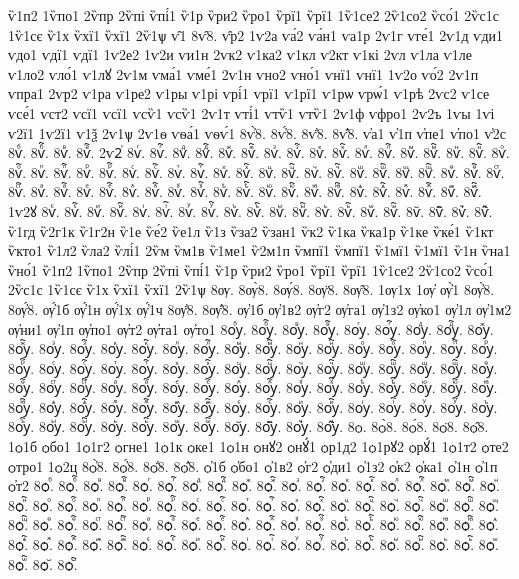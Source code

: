{ѷ1п2
1ѷпо1
2ѷпр
2ѷпі
ѷпі́1
ѷ1р
ѷри2
ѷро1
ѷрї1
ѷрї1
1ѷ1се2
2ѷ1со2
ѷсо́1
2ѷс1с
1ѷ1сє
ѷ1х
ѷхї1
ѷхї1
2ѷ1ѱ
ѵ̑1
8ѵ̑8.
ѵ̑р2
1ѵ2а
ѵа́2
ѵа́н1
ѵа1р
2ѵ1г
ѵге́1
2ѵ1д
ѵди1
ѵдо1
ѵдї1
ѵдї1
1ѵ2е2
1ѵ2и
ѵи1н
2ѵк2
ѵ1ка2
ѵ1кл
ѵ2кт
ѵ1кі
2ѵл
ѵ1ла
ѵ1ле
ѵ1ло2
ѵло́1
ѵ1лꙋ
2ѵ1м
ѵма́1
ѵме́1
2ѵ1н
ѵно2
ѵно́1
ѵнї1
ѵнї1
1ѵ2о
ѵо́2
2ѵ1п
ѵпра1
2ѵр2
ѵ1ра
ѵ1ре2
ѵ1ры
ѵ1рі
ѵрі́1
ѵрї1
ѵ1рї1
ѵ1рѡ
ѵрѡ́1
ѵ1рѣ
2ѵс2
ѵ1се
ѵсе́1
ѵст2
ѵсї1
ѵсї1
ѵсѷ1
ѵсѷ1
2ѵ1т
ѵті́1
ѵтѷ1
ѵтѷ1
2ѵ1ф
ѵфро1
2ѵ2ъ
1ѵы
1ѵі
ѵ2ї1
1ѵ2ї1
ѵ1ѯ
2ѵ1ѱ
2ѵ1ѳ
ѵѳа́1
ѵѳѵ́1
8ѵ҆̀8.
8ѵ҆́8.
8ѵ҆̈8.
8ѵ҆̑8.
ѵ҆а1
ѵ҆1п
ѵ҆пе1
ѵ҆по1
ѵ҆2с
8ѵⷠ.
8ѵⷠ҇.
8ѵⷡ.
8ѵⷡ҇.
2ѵ2ⷢ
8ѵⷢ.
8ѵⷢ҇.
8ѵⷣ.
8ѵⷣ҇.
8ѵⷤ.
8ѵⷤ҇.
8ѵⷥ.
8ѵⷥ҇.
8ѵⷦ.
8ѵⷦ҇.
8ѵⷧ.
8ѵⷧ҇.
8ѵⷨ.
8ѵⷨ҇.
8ѵⷩ.
8ѵⷩ҇.
8ѵⷪ.
8ѵⷪ҇.
8ѵⷫ.
8ѵⷫ҇.
8ѵⷬ.
8ѵⷬ҇.
8ѵⷭ.
8ѵⷭ҇.
8ѵⷮ.
8ѵⷮ҇.
8ѵⷯ.
8ѵⷯ҇.
8ѵⷰ.
8ѵⷰ҇.
8ѵⷱ.
8ѵⷱ҇.
8ѵⷲ.
8ѵⷲ҇.
8ѵⷳ.
8ѵⷳ҇.
8ѵⷴ.
8ѵⷴ҇.
8ѵⷵ.
8ѵⷵ҇.
8ѵⷶ.
8ѵⷶ҇.
8ѵⷷ.
8ѵⷷ҇.
8ѵⷸ.
8ѵⷸ҇.
8ѵⷹ.
8ѵⷹ҇.
8ѵⷺ.
8ѵⷺ҇.
8ѵⷻ.
8ѵⷻ҇.
8ѵⷼ.
8ѵⷼ҇.
8ѵⷽ.
8ѵⷽ҇.
8ѵⷾ.
8ѵⷾ҇.
8ѵⷿ.
8ѵⷿ҇.
1ѵ2ꙋ
8ѵꙴ.
8ѵꙴ҇.
8ѵꙵ.
8ѵꙵ҇.
8ѵꙶ.
8ѵꙶ҇.
8ѵꙷ.
8ѵꙷ҇.
8ѵꙸ.
8ѵꙸ҇.
8ѵꙹ.
8ѵꙹ҇.
8ѵꙺ.
8ѵꙺ҇.
8ѵꙻ.
8ѵꙻ҇.
8ѵ꙼.
8ѵ꙼҇.
8ѵ꙽.
8ѵ꙽҇.
ѷ1гд
ѷ2г1к
ѷ1г2н
ѷ1е
ѷе́2
ѷе1л
ѷ1з
ѷза2
ѷзан1
ѷк2
ѷ1ка
ѷка1р
ѷ1ке
ѷке́1
ѷ1кт
ѷкто1
ѷ1л2
ѷла2
ѷлі́1
2ѷм
ѷм1в
ѷ1ме1
ѷ2м1п
ѷмпї1
ѷмпї1
ѷ1мї1
ѷ1мї1
ѷ1н
ѷна1
ѷно́1
ѷ1п2
1ѷпо1
2ѷпр
2ѷпі
ѷпі́1
ѷ1р
ѷри2
ѷро1
ѷрї1
ѷрї1
1ѷ1се2
2ѷ1со2
ѷсо́1
2ѷс1с
1ѷ1сє
ѷ1х
ѷхї1
ѷхї1
2ѷ1ѱ
8ѹ.
8ѹ̀8.
8ѹ́8.
8ѹ̈8.
8ѹ̑8.
1ѹ1х
1ѹ҆
ѹ҆̀1
8ѹ҆̀8.
8ѹ҆́8.
ѹ҆́1б
ѹ҆́1н
ѹ҆́1х
ѹ҆́1ч
8ѹ҆̈8.
8ѹ҆̑8.
ѹ҆1б
ѹ҆1в2
ѹ҆г2
ѹ҆га1
ѹ҆1з2
ѹ҆ко1
ѹ҆1л
ѹ҆1м2
ѹ҆ни1
ѹ҆1п
ѹ҆по1
ѹ҆т2
ѹ҆та1
ѹ҆то1
8ѹⷠ.
8ѹⷠ҇.
8ѹⷡ.
8ѹⷡ҇.
8ѹⷢ.
8ѹⷢ҇.
8ѹⷣ.
8ѹⷣ҇.
8ѹⷤ.
8ѹⷤ҇.
8ѹⷥ.
8ѹⷥ҇.
8ѹⷦ.
8ѹⷦ҇.
8ѹⷧ.
8ѹⷧ҇.
8ѹⷨ.
8ѹⷨ҇.
8ѹⷩ.
8ѹⷩ҇.
8ѹⷪ.
8ѹⷪ҇.
8ѹⷫ.
8ѹⷫ҇.
8ѹⷬ.
8ѹⷬ҇.
8ѹⷭ.
8ѹⷭ҇.
8ѹⷮ.
8ѹⷮ҇.
8ѹⷯ.
8ѹⷯ҇.
8ѹⷰ.
8ѹⷰ҇.
8ѹⷱ.
8ѹⷱ҇.
8ѹⷲ.
8ѹⷲ҇.
8ѹⷳ.
8ѹⷳ҇.
8ѹⷴ.
8ѹⷴ҇.
8ѹⷵ.
8ѹⷵ҇.
8ѹⷶ.
8ѹⷶ҇.
8ѹⷷ.
8ѹⷷ҇.
8ѹⷸ.
8ѹⷸ҇.
8ѹⷹ.
8ѹⷹ҇.
8ѹⷺ.
8ѹⷺ҇.
8ѹⷻ.
8ѹⷻ҇.
8ѹⷼ.
8ѹⷼ҇.
8ѹⷽ.
8ѹⷽ҇.
8ѹⷾ.
8ѹⷾ҇.
8ѹⷿ.
8ѹⷿ҇.
8ѹꙴ.
8ѹꙴ҇.
8ѹꙵ.
8ѹꙵ҇.
8ѹꙶ.
8ѹꙶ҇.
8ѹꙷ.
8ѹꙷ҇.
8ѹꙸ.
8ѹꙸ҇.
8ѹꙹ.
8ѹꙹ҇.
8ѹꙺ.
8ѹꙺ҇.
8ѹꙻ.
8ѹꙻ҇.
8ѹ꙼.
8ѹ꙼҇.
8ѹ꙽.
8ѹ꙽҇.
8ѻ.
8ѻ̀8.
8ѻ́8.
8ѻ̈8.
8ѻ̑8.
1ѻ1б
ѻбо1
1ѻ1г2
ѻгне1
1ѻ1к
ѻке1
1ѻ1н
ѻнꙋ2
ѻнꙋ́1
ѻр1д2
1ѻ1рꙋ2
ѻрꙋ́1
1ѻ1т2
ѻте2
ѻтро1
1ѻ2ц
8ѻ҆̀8.
8ѻ҆́8.
8ѻ҆̈8.
8ѻ҆̑8.
ѻ҆1б
ѻ҆бо1
ѻ҆1в2
ѻ҆г2
ѻ҆ди1
ѻ҆1з2
ѻ҆к2
ѻ҆ка1
ѻ҆1н
ѻ҆1п
ѻ҆т2
8ѻⷠ.
8ѻⷠ҇.
8ѻⷡ.
8ѻⷡ҇.
8ѻⷢ.
8ѻⷢ҇.
8ѻⷣ.
8ѻⷣ҇.
8ѻⷤ.
8ѻⷤ҇.
8ѻⷥ.
8ѻⷥ҇.
8ѻⷦ.
8ѻⷦ҇.
8ѻⷧ.
8ѻⷧ҇.
8ѻⷨ.
8ѻⷨ҇.
8ѻⷩ.
8ѻⷩ҇.
8ѻⷪ.
8ѻⷪ҇.
8ѻⷫ.
8ѻⷫ҇.
8ѻⷬ.
8ѻⷬ҇.
8ѻⷭ.
8ѻⷭ҇.
8ѻⷮ.
8ѻⷮ҇.
8ѻⷯ.
8ѻⷯ҇.
8ѻⷰ.
8ѻⷰ҇.
8ѻⷱ.
8ѻⷱ҇.
8ѻⷲ.
8ѻⷲ҇.
8ѻⷳ.
8ѻⷳ҇.
8ѻⷴ.
8ѻⷴ҇.
8ѻⷵ.
8ѻⷵ҇.
8ѻⷶ.
8ѻⷶ҇.
8ѻⷷ.
8ѻⷷ҇.
8ѻⷸ.
8ѻⷸ҇.
8ѻⷹ.
8ѻⷹ҇.
8ѻⷺ.
8ѻⷺ҇.
8ѻⷻ.
8ѻⷻ҇.
8ѻⷼ.
8ѻⷼ҇.
8ѻⷽ.
8ѻⷽ҇.
8ѻⷾ.
8ѻⷾ҇.
8ѻⷿ.
8ѻⷿ҇.
8ѻꙴ.
8ѻꙴ҇.
8ѻꙵ.
8ѻꙵ҇.
8ѻꙶ.
8ѻꙶ҇.
8ѻꙷ.
8ѻꙷ҇.
8ѻꙸ.
8ѻꙸ҇.
8ѻꙹ.
8ѻꙹ҇.
8ѻꙺ.
8ѻꙺ҇.
8ѻꙻ.
8ѻꙻ҇.
8ѻ꙼.
8ѻ꙼҇.
}
